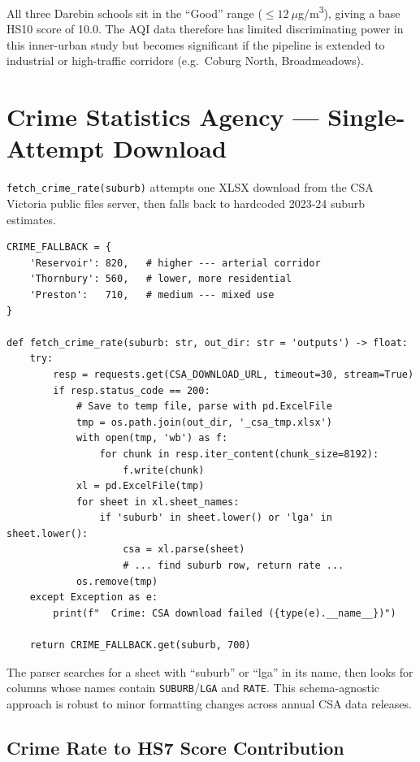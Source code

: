 \documentclass[11pt,a4paper,openany]{book}
\begin{document}
All three Darebin schools sit in the ``Good'' range ($\leq 12\ \mu$g/m\textsuperscript{3}),
giving a base HS10 score of 10.0.  The AQI data therefore has limited discriminating
power in this inner-urban study but becomes significant if the pipeline is extended to
industrial or high-traffic corridors (e.g.\ Coburg North, Broadmeadows).

\section{Crime Statistics Agency --- Single-Attempt Download}

\texttt{fetch\_crime\_rate(suburb)} attempts one XLSX download from the CSA Victoria
public files server, then falls back to hardcoded 2023-24 suburb estimates.

\begin{lstlisting}[style=python, caption={CSA Victoria crime rate fetcher in crime\_fetcher.py.}]
CRIME_FALLBACK = {
    'Reservoir': 820,   # higher --- arterial corridor
    'Thornbury': 560,   # lower, more residential
    'Preston':   710,   # medium --- mixed use
}

def fetch_crime_rate(suburb: str, out_dir: str = 'outputs') -> float:
    try:
        resp = requests.get(CSA_DOWNLOAD_URL, timeout=30, stream=True)
        if resp.status_code == 200:
            # Save to temp file, parse with pd.ExcelFile
            tmp = os.path.join(out_dir, '_csa_tmp.xlsx')
            with open(tmp, 'wb') as f:
                for chunk in resp.iter_content(chunk_size=8192):
                    f.write(chunk)
            xl = pd.ExcelFile(tmp)
            for sheet in xl.sheet_names:
                if 'suburb' in sheet.lower() or 'lga' in sheet.lower():
                    csa = xl.parse(sheet)
                    # ... find suburb row, return rate ...
            os.remove(tmp)
    except Exception as e:
        print(f"  Crime: CSA download failed ({type(e).__name__})")

    return CRIME_FALLBACK.get(suburb, 700)
\end{lstlisting}

The parser searches for a sheet with ``suburb'' or ``lga'' in its name, then
looks for columns whose names contain \texttt{SUBURB}/\texttt{LGA} and \texttt{RATE}.
This schema-agnostic approach is robust to minor formatting changes across annual CSA
data releases.

\subsection{Crime Rate to HS7 Score Contribution}
\end{document}
